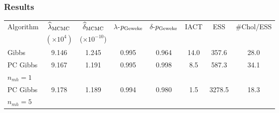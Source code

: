 \documentclass[]{beamer}
\renewcommand{\hat}{\widehat}
\begin{document}
\begin{frame}[t]
  \frametitle{Results}

\vspace{3em}

{\tiny
  \begin{tabular}{l|ccccccc}
    \hline
    Algorithm           & $\hat{\lambda}_{\rm MCMC}$& $\hat{\delta}_{\rm MCMC}$& $\lambda$-$p_{\rm Geweke}$&$\delta$-$p_{\rm Geweke}$& IACT & ESS    & \#Chol/ESS \\
     & $(\times 10^{4})$ & ($\times 10^{-10}$) & & \\
    \hline
                  Gibbs &                 9.146 &               1.245  &                     0.995 &                    0.964& 14.0 &  357.6 &      \alert{28.0} \\
              PC Gibbs  &                 9.167 &               1.191  &                     0.995 &                    0.998&  8.5 &  587.3 &      \alert{34.1} \\
\hspace{.2in}$n_{mh}=1$ & & & & & & & \\
               PC Gibbs &                 9.178 &               1.189  &                     0.994 &                    0.980&  1.5 & 3278.5 &      \alert{18.3} \\
\hspace{.2in} $n_{mh}=5$ & & & & & & & \\
    \hline
  \end{tabular}
}

\end{frame}
\end{document}
